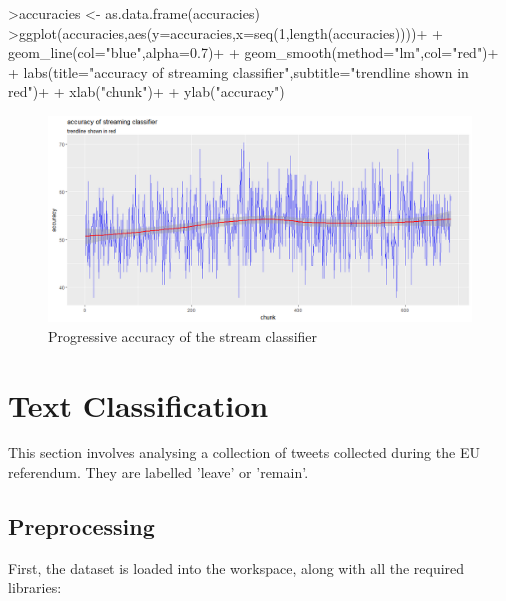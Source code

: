 \documentclass[10pt]{article}
\begin{document}
\begin{Schunk}
\begin{Sinput}
>accuracies <- as.data.frame(accuracies)
>ggplot(accuracies,aes(y=accuracies,x=seq(1,length(accuracies))))+
+  geom_line(col="blue",alpha=0.7)+
+ geom_smooth(method="lm",col="red")+
+  labs(title="accuracy of streaming classifier",subtitle="trendline shown in red")+
+  xlab("chunk")+
+  ylab("accuracy")

\end{Sinput}
\end{Schunk}


\begin{figure}[H]
\begin{center}
\includegraphics{stream_result}
\caption {Progressive accuracy of the stream classifier}
\label{fig2}
\end {center}
\end {figure}

\pagebreak

\section {Text Classification}

This section involves analysing a collection of tweets collected during the EU referendum. They are labelled 'leave' or 'remain'.



\subsection{Preprocessing}

First, the dataset is loaded into the workspace, along with all the required libraries:
\end{document}
